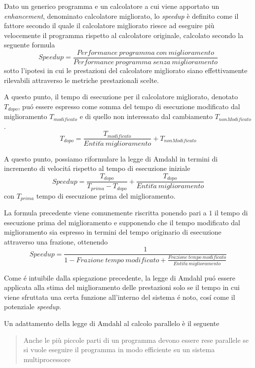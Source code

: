 Dato un generico programma e un calcolatore a cui viene apportato un \textit{enhancement}, denominato calcolatore migliorato,
lo \textit{speedup} è definito come il fattore secondo il quale il calcolatore migliorato riesce ad eseguire più
velocemente il programma rispetto al calcolatore originale, calcolato secondo la seguente formula
\[
    Speedup=\frac{Performance\ programma\ con\ miglioramento}{Performance\ programma\ senza\ miglioramento}
\]
sotto l’ipotesi in cui le prestazioni del calcolatore migliorato siano effettivamente rilevabili attraverso le metriche
prestazionali
scelte.

A questo punto, il tempo di esecuzione per il calcolatore migliorato, denotato $T_{dopo}$, pu\'o essere espresso come somma 
del tempo di esecuzione modificato dal miglioramento $T_{modificato}$ e di quello non interessato dal cambiamento 
$T_{nonModificato}$.
\[
    T_{dopo}=\frac{T_{modificato}}{Entit\grave{a}~miglioramento} + T_{nonModificato}
\]

A questo punto, possiamo riformulare la legge di Amdahl in termini di incremento di velocit\'a rispetto al tempo di esecuzione iniziale
\[
    \mathit{Speedup}=\frac{T_{dopo}}{T_{prima}-T_{dopo}}+\frac{T_{dopo}}{Entit\grave{a}~miglioramento}
\]
con $T_{prima}$ tempo di esecuzione prima del miglioramento.

La formula precedente viene comunemente riscritta ponendo pari a $1$ il tempo di esecuzione prima del miglioramento e supponendo che
il tempo modificato dal miglioramento sia espresso in termini del tempo originario di esecuzione attraverso una frazione, ottenendo
\[
\mathit{Speedup} = \frac{1}{1 - \mathit{Frazione~tempo~modificato} + \frac{\mathit{Frazione~tempo~modificato}}{\mathit{Entit\grave{a}~miglioramento}}}
\]

Come \'e intuibile dalla spiegazione precedente, la legge di Amdahl pu\'o essere applicata alla stima del miglioramento delle 
prestazioni solo se il tempo in cui viene sfruttata una certa funzione all'interno del sistema \'e noto, cos\'i come il 
potenziale \textit{speedup}.

Un adattamento della legge di Amdahl al calcolo parallelo è il seguente

\blockquote{Anche le più piccole parti di un programma devono essere rese parallele se si vuole eseguire il programma in modo efficiente su un sistema multiprocessore}

